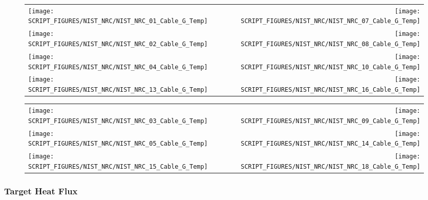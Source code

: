 \begin{figure}[!ht]
\begin{tabular*}{\textwidth}{l@{\extracolsep{\fill}}r}
\texttt{[image: SCRIPT\_FIGURES/NIST\_NRC/NIST\_NRC\_01\_Cable\_G\_Temp]} &
\texttt{[image: SCRIPT\_FIGURES/NIST\_NRC/NIST\_NRC\_07\_Cable\_G\_Temp]} \\
\texttt{[image: SCRIPT\_FIGURES/NIST\_NRC/NIST\_NRC\_02\_Cable\_G\_Temp]} &
\texttt{[image: SCRIPT\_FIGURES/NIST\_NRC/NIST\_NRC\_08\_Cable\_G\_Temp]} \\
\texttt{[image: SCRIPT\_FIGURES/NIST\_NRC/NIST\_NRC\_04\_Cable\_G\_Temp]} &
\texttt{[image: SCRIPT\_FIGURES/NIST\_NRC/NIST\_NRC\_10\_Cable\_G\_Temp]} \\
\texttt{[image: SCRIPT\_FIGURES/NIST\_NRC/NIST\_NRC\_13\_Cable\_G\_Temp]} &
\texttt{[image: SCRIPT\_FIGURES/NIST\_NRC/NIST\_NRC\_16\_Cable\_G\_Temp]}
\end{tabular*}
\label{NIST_NRC_Cable_G_Closed}
\end{figure}

\begin{figure}[!ht]
\begin{tabular*}{\textwidth}{l@{\extracolsep{\fill}}r}
\texttt{[image: SCRIPT\_FIGURES/NIST\_NRC/NIST\_NRC\_03\_Cable\_G\_Temp]} &
\texttt{[image: SCRIPT\_FIGURES/NIST\_NRC/NIST\_NRC\_09\_Cable\_G\_Temp]} \\
\texttt{[image: SCRIPT\_FIGURES/NIST\_NRC/NIST\_NRC\_05\_Cable\_G\_Temp]} &
\texttt{[image: SCRIPT\_FIGURES/NIST\_NRC/NIST\_NRC\_14\_Cable\_G\_Temp]} \\
\texttt{[image: SCRIPT\_FIGURES/NIST\_NRC/NIST\_NRC\_15\_Cable\_G\_Temp]} &
\texttt{[image: SCRIPT\_FIGURES/NIST\_NRC/NIST\_NRC\_18\_Cable\_G\_Temp]}
\end{tabular*}
\label{NIST_NRC_Cable_G_Open}
\end{figure}

\clearpage

\subsubsection{Target Heat Flux}

